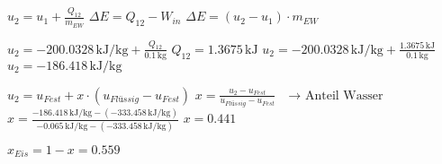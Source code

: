 \( u_2 = u_1 + \frac{Q_{12}}{m_{EW}} \)  
\( \Delta E = Q_{12} - W_{in} \)  
\( \Delta E = (u_2 - u_1) \cdot m_{EW} \)  

\( u_2 = -200.0328 \, \text{kJ/kg} + \frac{Q_{12}}{0.1 \, \text{kg}} \)  
\( Q_{12} = 1.3675 \, \text{kJ} \)  
\( u_2 = -200.0328 \, \text{kJ/kg} + \frac{1.3675 \, \text{kJ}}{0.1 \, \text{kg}} \)  
\( u_2 = -186.418 \, \text{kJ/kg} \)  

\( u_2 = u_{Fest} + x \cdot (u_{Flüssig} - u_{Fest}) \)  
\( x = \frac{u_2 - u_{Fest}}{u_{Flüssig} - u_{Fest}} \quad \text{→ Anteil Wasser} \)  
\( x = \frac{-186.418 \, \text{kJ/kg} - (-333.458 \, \text{kJ/kg})}{-0.065 \, \text{kJ/kg} - (-333.458 \, \text{kJ/kg})} \)  
\( x = 0.441 \)  

\( x_{Eis} = 1 - x = 0.559 \)